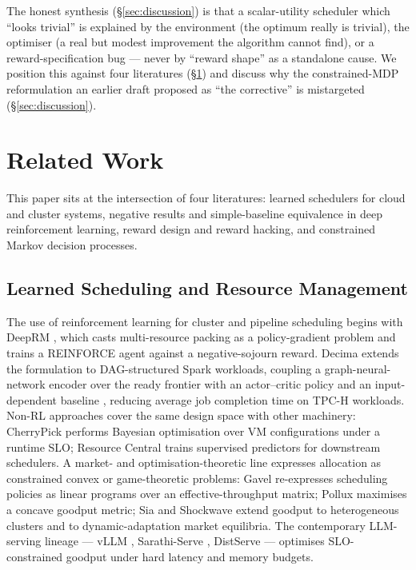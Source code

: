 \documentclass[10pt,twocolumn]{article}
\begin{document}
The honest synthesis (\S\ref{sec:discussion}) is that a scalar-utility scheduler
which ``looks trivial'' is explained by the environment (the optimum really is
trivial), the optimiser (a real but modest improvement the algorithm cannot
find), or a reward-specification bug --- never by ``reward shape'' as a
standalone cause. We position this against four literatures
(\S\ref{sec:related}) and discuss why the constrained-MDP reformulation an
earlier draft proposed as ``the corrective'' is mistargeted
(\S\ref{sec:discussion}).

\section{Related Work}
\label{sec:related}

This paper sits at the intersection of four literatures: learned schedulers for
cloud and cluster systems, negative results and simple-baseline equivalence in
deep reinforcement learning, reward design and reward hacking, and constrained
Markov decision processes.

\subsection{Learned Scheduling and Resource Management}
The use of reinforcement learning for cluster and pipeline scheduling begins with
DeepRM \cite{mao2016deeprm}, which casts multi-resource packing as a
policy-gradient problem and trains a REINFORCE agent against a negative-sojourn
reward. Decima \cite{mao2019decima} extends the formulation to DAG-structured
Spark workloads, coupling a graph-neural-network encoder over the ready frontier
with an actor--critic policy and an input-dependent baseline \cite{mao2019variance},
reducing average job completion time on TPC-H workloads. Non-RL approaches cover
the same design space with other machinery: CherryPick \cite{alipourfard2017cherrypick}
performs Bayesian optimisation over VM configurations under a runtime SLO;
Resource Central \cite{cortez2017resource} trains supervised predictors for
downstream schedulers. A market- and optimisation-theoretic line expresses
allocation as constrained convex or game-theoretic problems: Gavel
\cite{narayanan2020gavel} re-expresses scheduling policies as linear programs
over an effective-throughput matrix; Pollux \cite{qiao2021pollux} maximises a
concave goodput metric; Sia \cite{subramanya2023sia} and Shockwave
\cite{zheng2023shockwave} extend goodput to heterogeneous clusters and to
dynamic-adaptation market equilibria. The contemporary LLM-serving lineage ---
vLLM \cite{kwon2023vllm}, Sarathi-Serve \cite{agrawal2024sarathi}, DistServe
\cite{zhong2024distserve} --- optimises SLO-constrained goodput under hard
latency and memory budgets.
\end{document}
